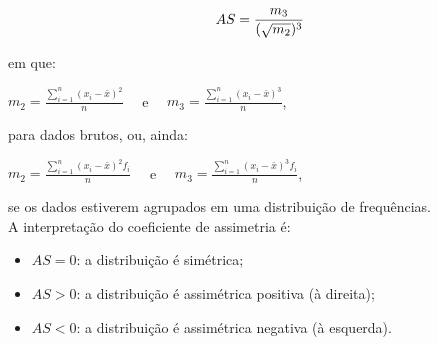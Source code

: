 \documentclass[11pt,fleqn]{book} %
\begin{document}
\begin{eBox}
\vspace{-0.5cm}
\begin{equation} \label{eq:coefassimetriapearson}
AS=\frac{m_3}{(\sqrt{m_2})^3} \\
\end{equation}
\end{eBox}

\noindent em que: \\

\begin{center}
$\displaystyle m_2=\frac{\displaystyle\sum_{i=1}^{n} (x_i-\bar{x})^2}{n}$ \,\,\,\, e \,\,\,\, $\displaystyle m_3=\frac{\displaystyle\sum_{i=1}^{n} (x_i-\bar{x})^3}{n}$, \\
\end{center}

\noindent para dados brutos, ou, ainda: \\

\begin{center}
$\displaystyle m_2=\frac{\displaystyle\sum_{i=1}^{n} (x_i-\bar{x})^2 f_i}{n}$ \,\,\,\, e \,\,\,\, $\displaystyle m_3=\frac{\displaystyle\sum_{i=1}^{n} (x_i-\bar{x})^3 f_i}{n}$, \\
\end{center}


\noindent se os dados estiverem agrupados em uma distribuição de frequências. \\

A interpretação do coeficiente de assimetria é: \\

\begin{itemize}
\item $AS=0$: a distribuição é simétrica;
\item $AS>0$: a distribuição é assimétrica positiva (à direita);
\item $AS<0$: a distribuição é assimétrica negativa (à esquerda). \\
\end{itemize}

\vspace{0,2cm}
\end{document}
